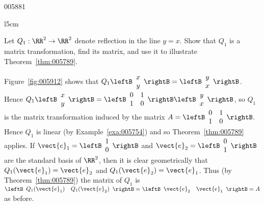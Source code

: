 \begin{example}{}{005881}
\begin{wrapfigure}[6]{l}{5cm} 
\centering

\caption{\label{fig:005912}}
\end{wrapfigure}

\setlength{\rightskip}{0pt plus 200pt}
Let $Q_{1} : \RR^2 \to \RR^2$ denote reflection in the line $y = x$. Show that $Q_{1}$ is a matrix transformation, find its matrix, and use it to illustrate Theorem~\ref{thm:005789}.

\begin{solution}
  Figure~\ref{fig:005912} shows that $Q_{1} \leftB \begin{array}{c}
  x \\
  y
  \end{array} \rightB = \leftB \begin{array}{c}
  y \\
  x
  \end{array} \rightB$. Hence $Q_{1} \leftB \begin{array}{c}
 x \\
 y
 \end{array} \rightB = \leftB \begin{array}{rr}
 0 & 1 \\
 1 & 0
 \end{array} \rightB \leftB \begin{array}{c}
 y \\
 x
 \end{array} \rightB$, so $Q_{1}$ is the matrix transformation induced by the matrix $A = \leftB \begin{array}{rr}
 0 & 1 \\
 1 & 0
 \end{array} \rightB$. Hence $Q_{1}$ is linear (by Example~\ref{exa:005754}) and so Theorem~\ref{thm:005789} applies. If $\vect{e}_{1} = \leftB \begin{array}{r}
 1 \\
 0
 \end{array} \rightB$
 and $\vect{e}_{2} = \leftB \begin{array}{r}
 0 \\
 1
 \end{array} \rightB$
 are the standard basis of $\RR^2$, then it is clear geometrically that $Q_{1}(\vect{e}_{1}) = \vect{e}_{2}$ and $Q_{1}(\vect{e}_{2}) = \vect{e}_{1}$. Thus (by Theorem~\ref{thm:005789}) the matrix of $Q_{1}$ is $\leftB \begin{array}{cc}
 Q_{1}(\vect{e}_{1}) & Q_{1}(\vect{e}_{2})
 \end{array} \rightB = \leftB \begin{array}{cc}
 \vect{e}_{2} & \vect{e}_{1}
 \end{array} \rightB = A$ as before.

\end{solution}
\end{example}

